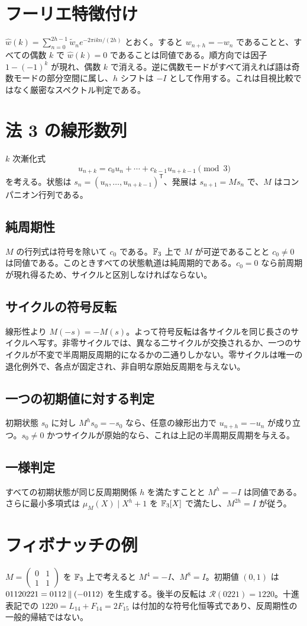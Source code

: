 \documentclass[11pt,a4paper]{article}
\begin{document}
\section{フーリエ特徴付け}
\(\widehat w(k)=\sum_{n=0}^{2h-1}\widetilde w_ne^{-2\pi i kn/(2h)}\) とおく。すると \(w_{n+h}=-w_n\) であることと、すべての偶数 \(k\) で \(\widehat w(k)=0\) であることは同値である。順方向では因子 \(1-(-1)^k\) が現れ、偶数 \(k\) で消える。逆に偶数モードがすべて消えれば語は奇数モードの部分空間に属し、\(h\) シフトは \(-I\) として作用する。これは目視比較ではなく厳密なスペクトル判定である。
\section{法 3 の線形数列}
\(k\) 次漸化式 \[u_{n+k}=c_0u_n+\cdots+c_{k-1}u_{n+k-1}\pmod3\] を考える。状態は \(s_n=(u_n,\ldots,u_{n+k-1})^{\mathsf T}\)、発展は \(s_{n+1}=Ms_n\) で、\(M\) はコンパニオン行列である。
\subsection{純周期性}
\(M\) の行列式は符号を除いて \(c_0\) である。\(\mathbb F_3\) 上で \(M\) が可逆であることと \(c_0\neq0\) は同値である。このときすべての状態軌道は純周期的である。\(c_0=0\) なら前周期が現れ得るため、サイクルと区別しなければならない。
\subsection{サイクルの符号反転}
線形性より \(M(-s)=-M(s)\)。よって符号反転は各サイクルを同じ長さのサイクルへ写す。非零サイクルでは、異なる二サイクルが交換されるか、一つのサイクルが不変で半周期反周期的になるかの二通りしかない。零サイクルは唯一の退化例外で、各点が固定され、非自明な原始反周期を与えない。
\subsection{一つの初期値に対する判定}
初期状態 \(s_0\) に対し \(M^hs_0=-s_0\) なら、任意の線形出力で \(u_{n+h}=-u_n\) が成り立つ。\(s_0\neq0\) かつサイクルが原始的なら、これは上記の半周期反周期を与える。
\subsection{一様判定}
すべての初期状態が同じ反周期関係 \(h\) を満たすことと \(M^h=-I\) は同値である。さらに最小多項式は \(\mu_M(X)\mid X^h+1\) を \(\mathbb F_3[X]\) で満たし、\(M^{2h}=I\) が従う。
\section{フィボナッチの例}
\(M=\begin{pmatrix}0&1\\1&1\end{pmatrix}\) を \(\mathbb F_3\) 上で考えると \(M^4=-I\)、\(M^8=I\)。初期値 \((0,1)\) は \(01120221=0112\mathbin{\Vert}(-0112)\) を生成する。後半の反転は \(\mathcal R(0221)=1220\)。十進表記での \(1220=L_{14}+F_{14}=2F_{15}\) は付加的な符号化恒等式であり、反周期性の一般的帰結ではない。
\end{document}
